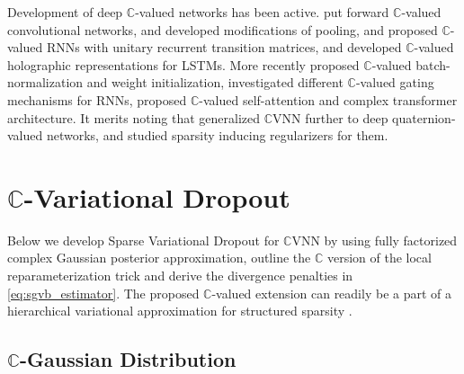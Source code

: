 \documentclass[a4paper,10pt,twocolumn]{article}
\newcommand{\cplx}{\mathbb{C}}
\newcommand{\important}[1]{\textbf{\!\colorbox{red}{#1}\!}}
\newcommand{\todo}[1]{{\color{blue} [TODO]} \important{#1}}
\begin{document}
Development of deep $\cplx$-valued networks has been active. \citet{haensch_complex-valued_2010}
put forward $\cplx$-valued convolutional networks, \citet{guberman_complex_2016} and
\citet{popa_complex-valued_2017} developed modifications of pooling, \citet{arjovsky_unitary_2016}
and \citet{wisdom_full-capacity_2016} proposed $\cplx$-valued RNNs with unitary recurrent
transition matrices, and \citet{danihelka_associative_2016} developed $\cplx$-valued
holographic representations for LSTMs. More recently \citet{trabelsi_deep_2018} proposed
$\cplx$-valued batch-normalization and weight initialization, \citet{wolter_complex_2018}
investigated different $\cplx$-valued gating mechanisms for RNNs, \citet{yang_complex_2019}
proposed $\cplx$-valued self-attention and complex transformer architecture. It merits
noting that \citet{gaudet_deep_2018} generalized $\cplx$VNN further to deep quaternion-valued
networks, and \citet{vecchi_compressing_2020} studied sparsity inducing regularizers for
them.





\section{$\cplx$-Variational Dropout} %
\label{sec:c_variational_dropout}

Below we develop Sparse Variational Dropout for $\cplx$VNN by using fully factorized
complex Gaussian posterior approximation, outline the $\cplx$ version of the local
reparameterization trick and derive the divergence penalties in \eqref{eq:sgvb_estimator}.
The proposed $\cplx$-valued extension can readily be a part of a hierarchical variational
approximation for structured sparsity \citep{louizos_bayesian_2017}.

\subsection{$\cplx$-Gaussian Distribution} %
\label{sub:c_gauss_and_local_rep}
\end{document}
